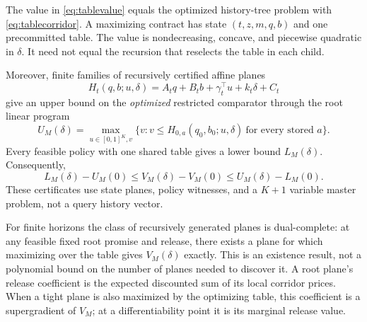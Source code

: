 \begin{theorem}\label{thm:bridge}
The value in \eqref{eq:tablevalue} equals the optimized history-tree problem with \eqref{eq:tablecorridor}. A maximizing contract has state $(t,z,m,q,b)$ and one precommitted table. The value is nondecreasing, concave, and piecewise quadratic in $\delta$. It need not equal the recursion that reselects the table in each child.

Moreover, finite families of recursively certified affine planes
\[
 H_t(q,b;u,\delta)=A_tq+B_tb+\gamma_t^\top u+k_t\delta+C_t
\]
give an upper bound on the \emph{optimized} restricted comparator through the root linear program
\begin{equation}\label{eq:rootLP}
 U_M(\delta)=\max_{u\in[0,1]^K,v}\{v:v\leq H_{0,a}(q_0,b_0;u,\delta)\ \text{for every stored }a\}.
\end{equation}
Every feasible policy with one shared table gives a lower bound $L_M(\delta)$. Consequently,
\begin{equation}\label{eq:stategain}
 L_M(\delta)-U_M(0)\leq V_M(\delta)-V_M(0)
 \leq U_M(\delta)-L_M(0).
\end{equation}
These certificates use state planes, policy witnesses, and a $K+1$ variable master problem, not a query history vector.

For finite horizons the class of recursively generated planes is dual-complete: at any feasible fixed root promise and release, there exists a plane for which maximizing over the table gives $V_M(\delta)$ exactly. This is an existence result, not a polynomial bound on the number of planes needed to discover it. A root plane's release coefficient is the expected discounted sum of its local corridor prices. When a tight plane is also maximized by the optimizing table, this coefficient is a supergradient of $V_M$; at a differentiability point it is its marginal release value.
\end{theorem}

